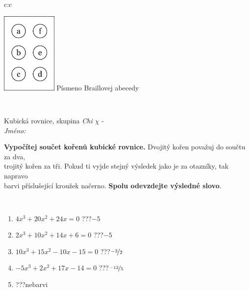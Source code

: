 \documentclass[10pt]{report}
\begin{document}
\begin{tabular}{c:c}
\begin{minipage}[c][104.5mm][t]{0.5\linewidth}
\begin{center}
\begin{minipage}{0.20\linewidth}
\begin{center}
\includegraphics[height=40mm]{../images/braille.png}
{\small Písmeno Braillovej abecedy}
\end{center}
\end{minipage}
\end{center}
\end{minipage}
\\ \hdashline
\begin{minipage}[c][104.5mm][t]{0.5\linewidth}
\begin{center}
\vspace{7mm}
{\huge Kubická rovnice, skupina \textit{Chi $\chi$} -}\\[5mm]
\textit{Jméno:}\phantom{xxxxxxxxxxxxxxxxxxxxxxxxxxxxxxxxxxxxxxxxxxxxxxxxxxxxxxxxxxxxxxxxx}\\[5mm]
\begin{minipage}{0.95\linewidth}
\begin{center}
\textbf{Vypočítej součet kořenů kubické rovnice.} Dvojitý kořen považuj do součtu za dva,\\trojitý kořen za tři. Pokud ti vyjde stejný výsledek jako je za otazníky, tak napravo\\barvi příslušející kroužek načerno. \textbf{Spolu odevzdejte výsledné slovo}.
\end{center}
\end{minipage}
\\[1mm]
\begin{minipage}{0.79\linewidth}
\begin{center}
\begin{varwidth}{\linewidth}
\begin{enumerate}
\Large
\item $4x^3+20x^2+24x=0$\quad \dotfill\; ???\;\dotfill \quad $-5$
\item $2x^3+10x^2+14x+6=0$\quad \dotfill\; ???\;\dotfill \quad $-5$
\item $10x^3+15x^2-10x-15=0$\quad \dotfill\; ???\;\dotfill \quad $\nicefrac{-3}{2}$
\item $-5x^3+2x^2+17x-14=0$\quad \dotfill\; ???\;\dotfill \quad $\nicefrac{-12}{5}$
\item \quad \dotfill\; ???\;\dotfill \quad nebarvi

\end{enumerate}
\end{varwidth}
\end{center}
\end{minipage}
\end{center}
\end{minipage}
\end{tabular}
\end{document}
